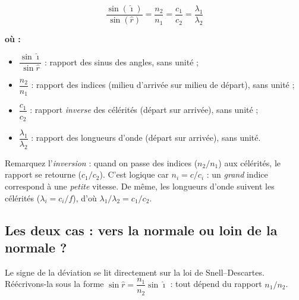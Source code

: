 \documentclass[11pt,a4paper]{article}
\newenvironment{ou}{%
  \par\smallskip\noindent\textbf{où :}\nopagebreak
  \begin{itemize}[leftmargin=1.8em,topsep=2pt,itemsep=1.5pt,parsep=0pt]}%
  {\end{itemize}}
\newcommand{\angi}{\hat{\imath}}     %
\newcommand{\angr}{\hat{r}}          %
\begin{document}
\begin{formule}
\[ \boxed{\;\dfrac{\sin(\angi)}{\sin(\angr)} = \dfrac{n_2}{n_1} = \dfrac{c_1}{c_2} = \dfrac{\lambda_1}{\lambda_2}\;} \]
\begin{ou}
  \item $\dfrac{\sin\angi}{\sin\angr}$ : rapport des sinus des angles, sans unité ;
  \item $\dfrac{n_2}{n_1}$ : rapport des indices (milieu d'arrivée sur milieu de départ), sans unité ;
  \item $\dfrac{c_1}{c_2}$ : rapport \emph{inverse} des célérités (départ sur arrivée), sans unité ;
  \item $\dfrac{\lambda_1}{\lambda_2}$ : rapport des longueurs d'onde (départ sur arrivée), sans unité.
\end{ou}
\end{formule}

\begin{attention}
Remarquez l'\emph{inversion} : quand on passe des indices ($n_2/n_1$) aux célérités, le rapport se
retourne ($c_1/c_2$). C'est logique car $n_i = c/c_i$ : un \emph{grand} indice correspond à une
\emph{petite} vitesse. De même, les longueurs d'onde suivent les célérités ($\lambda_i = c_i/f$),
d'où $\lambda_1/\lambda_2 = c_1/c_2$.
\end{attention}

\subsection{Les deux cas : vers la normale ou loin de la normale ?}

Le signe de la déviation se lit directement sur la loi de Snell–Descartes. Réécrivons-la sous la
forme $\sin\angr = \dfrac{n_1}{n_2}\sin\angi$ : tout dépend du rapport $n_1/n_2$.
\end{document}
